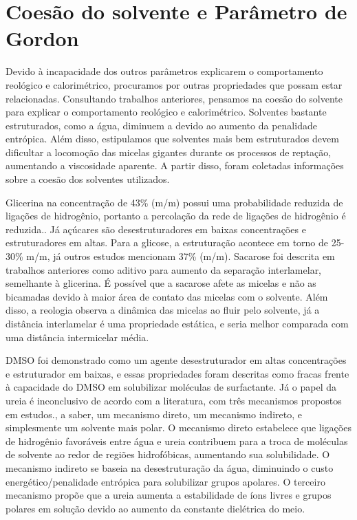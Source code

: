 		
		\FloatBarrier
		\section{Coesão do solvente e Parâmetro de Gordon}  
		
		Devido à incapacidade dos outros parâmetros explicarem o comportamento reológico e calorimétrico, procuramos por outras propriedades que possam estar relacionadas. Consultando trabalhos anteriores, pensamos na coesão do solvente para explicar o comportamento reológico e calorimétrico. Solventes bastante estruturados, como a água, diminuem a \cmc{} devido ao aumento da penalidade entrópica. Além disso, estipulamos que solventes mais bem estruturados devem dificultar a locomoção das micelas gigantes durante os processos de reptação, aumentando a viscosidade aparente. A partir disso, foram coletadas informações sobre a coesão dos solventes utilizados.
		
		Glicerina na concentração de 43\% (m/m) possui uma probabilidade reduzida de ligações de hidrogênio, portanto a percolação da rede de ligações de hidrogênio é reduzida.\cite{Parsons2001a, Dashnau2006}. Já açúcares são desestruturadores em baixas concentrações e estruturadores em altas. Para a glicose, a estruturação acontece em torno de 25-30\% m/m,\cite{Giangiacomo2006} já outros estudos mencionam 37\% (m/m).\cite{Ueberreiter1982} Sacarose foi descrita em trabalhos anteriores \cite{Song2008a} como aditivo para aumento da separação interlamelar, semelhante à glicerina. É possível que a sacarose afete as micelas e não as bicamadas devido à maior área de contato das micelas com o solvente. Além disso, a reologia observa a dinâmica das micelas ao fluir pelo solvente, já a distância interlamelar é uma propriedade estática, e seria melhor comparada com uma distância intermicelar média.
		
		DMSO foi demonstrado como um agente desestruturador em altas concentrações e estruturador em baixas, e essas propriedades foram descritas como fracas frente à capacidade do DMSO em solubilizar moléculas de surfactante.\cite{Bertoluzza1979b}
		Já o papel da ureia é inconclusivo de acordo com a literatura, com três mecanismos propostos em estudos.\cite{Dias2002}, a saber, um mecanismo direto, um mecanismo indireto, e simplesmente um solvente mais polar. O mecanismo direto estabelece que ligações de hidrogênio favoráveis entre água e ureia contribuem para a troca de moléculas de solvente ao redor de regiões hidrofóbicas, aumentando sua solubilidade. O mecanismo indireto se baseia na desestruturação da água, diminuindo o custo energético/penalidade entrópica para solubilizar grupos apolares. O terceiro mecanismo propõe que a ureia aumenta a estabilidade de íons livres e grupos polares em solução devido ao aumento da constante dielétrica do meio.\cite{Dias2002}
		
